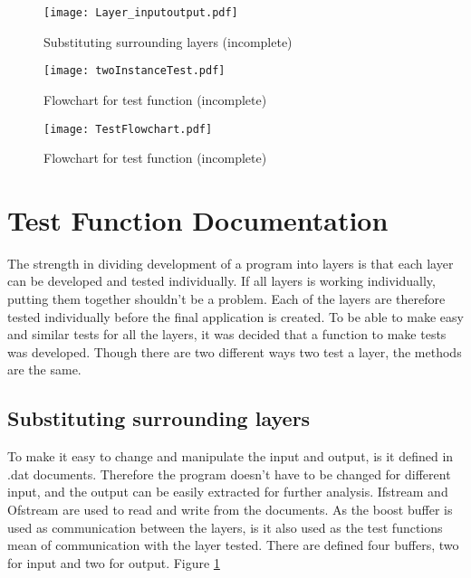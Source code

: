 \begin{figure}[htb]
	\begin{center}
	\texttt{[image: Layer\_inputoutput.pdf]}
	\caption{Substituting surrounding layers (incomplete)}
	\label{fig:Layer_inputoutput}	
	\end{center}
\end{figure}

\begin{figure}[htb]
	\begin{center}
	\texttt{[image: twoInstanceTest.pdf]}
	\caption{Flowchart for test function (incomplete)}
	\label{fig:twoInstanceTest}	
	\end{center}
\end{figure}

\begin{figure}[htb]
	\begin{center}
	\texttt{[image: TestFlowchart.pdf]}
	\caption{Flowchart for test function (incomplete)}
	\label{fig:TestFlowchart}	
	\end{center}
\end{figure}




\section{Test Function Documentation}
The strength in dividing development of a program into layers is that each layer can be developed and tested individually. If all layers is working individually, putting them together shouldn't be a problem. Each of the layers are therefore tested individually before the final application is created. To be able to make easy and similar tests for all the layers, it was decided that a function to make tests was developed. Though there are two different ways two test a layer, the methods are the same.

\subsection{Substituting surrounding layers}
To make it easy to change and manipulate the input and output, is it defined in .dat documents. Therefore the program doesn't have to be changed for different input, and the output can be easily extracted for further analysis. Ifstream and Ofstream are used to read and write from the documents. 
As the boost buffer is used as communication between the layers, is it also used as the test functions mean of communication with the layer tested. There are defined four buffers, two for input and two for output.
Figure \ref{fig:Layer_inputoutput}

